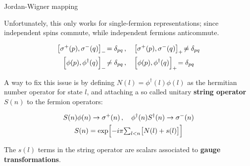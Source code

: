 \begin{frame}[allowframebreaks]{Jordan-Wigner mapping}


	Unfortunately, this only works for single-fermion representations; since independent spins commute, while independent fermions anticommute.

	\begin{gather*}
	  \com{\sigma^{+}(p)}{\sigma^{-}(q)} = \delta_{pq} \qc
	    \acom{\sigma^{+}(p)}{\sigma^{-}(q)} \neq \delta_{pq} \\
	  \com{\phi(p)}{\phi^{\dagger}(q)} \neq \delta_{pq} \qc
	    \acom{\phi(p)}{\phi^{\dagger}(q)} = \delta_{pq}
	\end{gather*}


	A way to fix this issue is by defining $N(l)=\phi^{\dagger}(l)\phi(l)$ as the hermitian number operator for state $l$, and attaching a so called unitary \textbf{string operator} $S(n)$ to the fermion operators:

	\begin{gather*}
		\begin{split}
			S(n)\phi(n) \rightarrow \sigma^{+}(n) \,,\quad
			\phi^{\dagger}(n)S^{\dagger}(n) \rightarrow \sigma^{-}(n)
		\end{split} \\
		S(n) = \exp[ -i\pi {\textstyle\sum_{l<n}} \qty[N(l)+s(l)] ]
	\end{gather*}

	The $s(l)$ terms in the string operator are scalars associated to \textbf{gauge transformations}.%



\end{frame}
